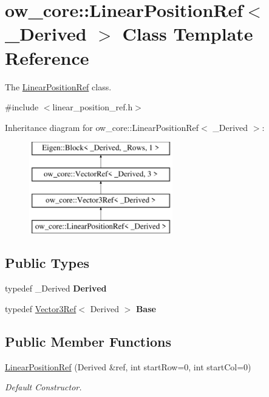 \hypertarget{classow__core_1_1LinearPositionRef}{}\section{ow\+\_\+core\+:\+:Linear\+Position\+Ref$<$ \+\_\+\+Derived $>$ Class Template Reference}
\label{classow__core_1_1LinearPositionRef}


The \hyperlink{classow__core_1_1LinearPositionRef}{Linear\+Position\+Ref} class.  




{\ttfamily \#include $<$linear\+\_\+position\+\_\+ref.\+h$>$}

Inheritance diagram for ow\+\_\+core\+:\+:Linear\+Position\+Ref$<$ \+\_\+\+Derived $>$\+:\begin{figure}[H]
\begin{center}
\leavevmode
\includegraphics[height=4.000000cm]{da/d4c/classow__core_1_1LinearPositionRef}
\end{center}
\end{figure}
\subsection*{Public Types}
\begin{DoxyCompactItemize}
\item 
typedef \+\_\+\+Derived {\bfseries Derived}\hypertarget{classow__core_1_1LinearPositionRef_a44d84d26f5ce03cb78cb010c148e9553}{}\label{classow__core_1_1LinearPositionRef_a44d84d26f5ce03cb78cb010c148e9553}

\item 
typedef \hyperlink{classow__core_1_1Vector3Ref}{Vector3\+Ref}$<$ Derived $>$ {\bfseries Base}\hypertarget{classow__core_1_1LinearPositionRef_aa1bd5a9697af32ea64d5ef320b93362f}{}\label{classow__core_1_1LinearPositionRef_aa1bd5a9697af32ea64d5ef320b93362f}

\end{DoxyCompactItemize}
\subsection*{Public Member Functions}
\begin{DoxyCompactItemize}
\item 
\hyperlink{classow__core_1_1LinearPositionRef_a5e8d28ff1c2e36eaefe533017d27c8aa}{Linear\+Position\+Ref} (Derived \&ref, int start\+Row=0, int start\+Col=0)
\begin{DoxyCompactList}\small\item\em Default Constructor. \end{DoxyCompactList}\end{DoxyCompactItemize}


